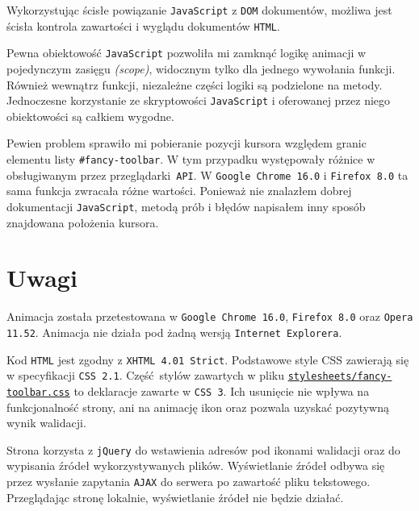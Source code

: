 \documentclass[10pt,a4paper]{article}
\newcommand{\f}[1]{\texttt{#1}}
\newcommand{\rev}{3b28a62c26319a36333406057e962ccbe1d4a198}
\newcommand{\revhref}[1] {\href{https://github.com/student-tomasz/pi-cwiczenie-2/blob/\rev/#1}{\f{#1}}}
\begin{document}
Wykorzystując ścisłe powiązanie \f{JavaScript} z \f{DOM} dokumentów, możliwa
jest ścisła kontrola zawartości i wyglądu dokumentów \f{HTML}.

Pewna obiektowość \f{JavaScript} pozwoliła mi zamknąć logikę animacji w
pojedynczym zasięgu \emph{(scope)}, widocznym tylko dla jednego wywołania
funkcji. Również wewnątrz funkcji, niezależne części logiki są podzielone na
metody. Jednoczesne korzystanie ze skryptowości \f{JavaScript} i oferowanej
przez niego obiektowości są całkiem wygodne.

Pewien problem sprawiło mi pobieranie pozycji kursora względem granic elementu
listy \f{\#fancy-toolbar}. W tym przypadku występowały różnice w obsługiwanym
przez przeglądarki \f{API}. W \f{Google Chrome 16.0} i \f{Firefox 8.0} ta sama
funkcja zwracała różne wartości. Ponieważ nie znalazłem dobrej dokumentacji
\f{JavaScript}, metodą prób i błędów napisałem inny sposób znajdowana położenia
kursora.



\section{Uwagi}

Animacja została przetestowana w \f{Google Chrome 16.0}, \f{Firefox 8.0} oraz
\f{Opera 11.52}. Animacja nie działa pod żadną wersją \f{Internet Explorera}. 

Kod \f{HTML} jest zgodny z \f{XHTML 4.01 Strict}. Podstawowe style CSS zawierają
się w specyfikacji \f{CSS 2.1}. Część stylów zawartych w pliku
\revhref{stylesheets/fancy-toolbar.css} to deklaracje zawarte w \f{CSS 3}. Ich
usunięcie nie wpływa na funkcjonalność strony, ani na animację ikon oraz pozwala
uzyskać pozytywną wynik walidacji.

Strona korzysta z \f{jQuery} do wstawienia adresów pod ikonami walidacji oraz do
wypisania źródeł wykorzystywanych plików. Wyświetlanie źródeł odbywa się przez
wysłanie zapytania \f{AJAX} do serwera po zawartość pliku tekstowego.
Przeglądając stronę lokalnie, wyświetlanie źródeł nie będzie działać.
\end{document}
